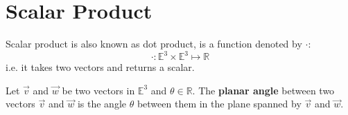\section{Scalar Product}

Scalar product is also known as dot product, is a function denoted by $\cdot$:
$$\cdot: \mathbb{E}^3 \times \mathbb{E}^3 \mapsto \mathbb{R}$$
i.e. it takes two vectors and returns a scalar.

\begin{definition}
  Let $\vec{v}$ and $\vec{w}$ be two vectors in $\mathbb{E}^3$ and $\theta \in \mathbb{R}$.
  \newline \newline
  The {\bf planar angle} between two vectors $\vec{v}$ and $\vec{w}$ is the angle $\theta$ between them in the plane spanned by $\vec{v}$ and $\vec{w}$.
  
  \begin{figure}[H]
    \centering

\begin{tikzpicture}[x=0.75pt,y=0.75pt,yscale=-1,xscale=1]


\end{tikzpicture}
\end{figure}
\end{definition}
